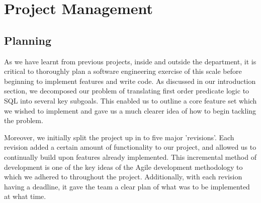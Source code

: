 \documentclass[a4paper, 11pt]{article}
\begin{document}
 

\section{Project Management}
  \subsection{Planning}
    As we have learnt from previous projects, inside and outside the
    department, it is critical to thoroughly plan a software engineering
    exercise of this scale before beginning to implement features and write
    code. As discussed in our introduction section, we decomposed our problem
    of translating first order predicate logic to SQL into several key
    subgoals. This enabled us to outline a core feature set which we wished to
    implement and gave us a much clearer idea of how to begin tackling the
    problem.

    Moreover, we initially split the project up in to five major 'revisions'.
    Each revision added a certain amount of functionality to our project, and
    allowed us to continually build upon features already implemented. This
    incremental method of development is one of the key ideas of the Agile
    development methodology to which we adhered to throughout the project.
    \cite{agilemanifesto} Additionally, with each revision having a
    deadline, it gave the team a clear plan of what was to be implemented at
    what time.
\end{document}
